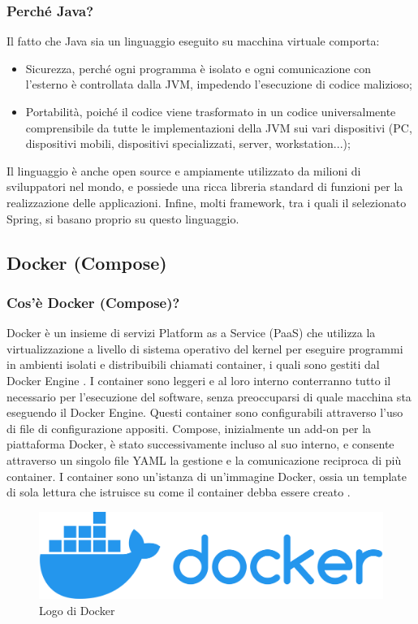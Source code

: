            \subsubsection{Perché Java?}
                Il fatto che Java sia un linguaggio eseguito su macchina virtuale comporta:
                \begin{itemize}
                    \item Sicurezza, perché ogni programma è isolato e ogni comunicazione con l'esterno è controllata dalla JVM, impedendo l'esecuzione di codice malizioso;
                    \item Portabilità, poiché il codice viene trasformato in un codice universalmente comprensibile da tutte le implementazioni della JVM sui vari dispositivi (PC, dispositivi mobili, dispositivi specializzati, server, workstation...);
                \end{itemize}
                Il linguaggio è anche open source e ampiamente utilizzato da milioni di sviluppatori nel mondo, e possiede una ricca libreria standard di funzioni per la realizzazione delle applicazioni. Infine, molti framework, tra i quali il selezionato Spring, si basano proprio su questo linguaggio.
                
        \subsection{Docker (Compose)}
            \subsubsection{Cos'è Docker (Compose)?}
                Docker è un insieme di servizi Platform as a Service (PaaS) che utilizza la virtualizzazione a livello di sistema operativo del kernel per eseguire programmi in ambienti isolati e distribuibili chiamati container, i quali sono gestiti dal Docker Engine \cite{Wikipedia5}. I container sono leggeri e al loro interno conterranno tutto il necessario per l'esecuzione del software, senza preoccuparsi di quale macchina sta eseguendo il Docker Engine. Questi container sono configurabili attraverso l'uso di file di configurazione appositi. Compose, inizialmente un add-on per la piattaforma Docker, è stato successivamente incluso al suo interno, e consente attraverso un singolo file YAML la gestione e la comunicazione reciproca di più container. I container sono un'istanza di un'immagine Docker, ossia un template di sola lettura che istruisce su come il container debba essere creato \cite{Docker1}.
            \begin{figure}[htbp!]
                \centering
                \includegraphics[width=0.5\linewidth]{Immagini/System Design/Docker.png}
                \caption{Logo di Docker}
            \end{figure}

